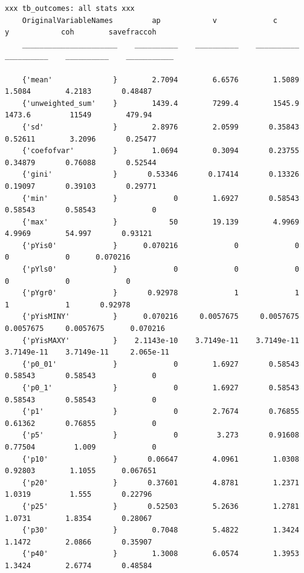 \documentclass[
]{book}
\begin{document}
\begin{verbatim}
xxx tb_outcomes: all stats xxx
    OriginalVariableNames         ap            v             c             y            coh        savefraccoh
    ______________________    __________    __________    __________    __________    __________    ___________

    {'mean'              }        2.7094        6.6576        1.5089        1.5084        4.2183       0.48487 
    {'unweighted_sum'    }        1439.4        7299.4        1545.9        1473.6         11549        479.94 
    {'sd'                }        2.8976        2.0599       0.35843       0.52611        3.2096       0.25477 
    {'coefofvar'         }        1.0694        0.3094       0.23755       0.34879       0.76088       0.52544 
    {'gini'              }       0.53346       0.17414       0.13326       0.19097       0.39103       0.29771 
    {'min'               }             0        1.6927       0.58543       0.58543       0.58543             0 
    {'max'               }            50        19.139        4.9969        4.9969        54.997       0.93121 
    {'pYis0'             }      0.070216             0             0             0             0      0.070216 
    {'pYls0'             }             0             0             0             0             0             0 
    {'pYgr0'             }       0.92978             1             1             1             1       0.92978 
    {'pYisMINY'          }      0.070216     0.0057675     0.0057675     0.0057675     0.0057675      0.070216 
    {'pYisMAXY'          }    2.1143e-10    3.7149e-11    3.7149e-11    3.7149e-11    3.7149e-11     2.065e-11 
    {'p0_01'             }             0        1.6927       0.58543       0.58543       0.58543             0 
    {'p0_1'              }             0        1.6927       0.58543       0.58543       0.58543             0 
    {'p1'                }             0        2.7674       0.76855       0.61362       0.76855             0 
    {'p5'                }             0         3.273       0.91608       0.77504         1.009             0 
    {'p10'               }       0.06647        4.0961        1.0308       0.92803        1.1055      0.067651 
    {'p20'               }       0.37601        4.8781        1.2371        1.0319         1.555       0.22796 
    {'p25'               }       0.52503        5.2636        1.2781        1.0731        1.8354       0.28067 
    {'p30'               }        0.7048        5.4822        1.3424        1.1472        2.0866       0.35907 
    {'p40'               }        1.3008        6.0574        1.3953        1.3424        2.6774       0.48584 

\end{verbatim}
\end{document}
